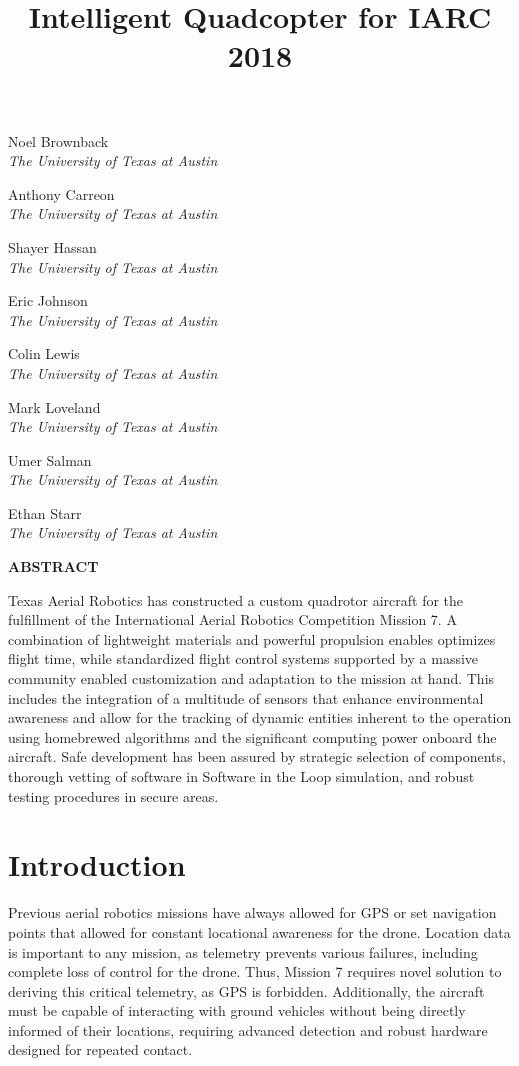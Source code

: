 \documentclass[12pt,letterpaper]{article}
\title{Intelligent Quadcopter for IARC 2018}
\newenvironment{nscenter}
 {\parskip=0pt\par\nopagebreak\centering}
 {\par\noindent\ignorespacesafterend}
\newcommand{\affiliatedauthor}[2]{
\begin{nscenter}
	#1 \\ \textit{#2}
\end{nscenter}
}
\renewcommand{\abstractname}{ABSTRACT}
\renewenvironment{abstract}
 {\vspace{-0.5ex}
	\small
	\begin{center}
		\bfseries \abstractname\vspace{-4ex}\vspace{0pt}
	\end{center}
	\list{}{
		\setlength{\leftmargin}{0.5in}
		\setlength{\rightmargin}{\leftmargin}
	}
	\item\relax}
 {\endlist}
\begin{document}
\begin{center}
	\textbf{\LARGE{\thetitle}}
\end{center}

\affiliatedauthor{Noel Brownback}{The University of Texas at Austin}
\affiliatedauthor{Anthony Carreon}{The University of Texas at Austin}
\affiliatedauthor{Shayer Hassan}{The University of Texas at Austin}
\affiliatedauthor{Eric Johnson}{The University of Texas at Austin}
\affiliatedauthor{Colin Lewis}{The University of Texas at Austin}
\affiliatedauthor{Mark Loveland}{The University of Texas at Austin}
\affiliatedauthor{Umer Salman}{The University of Texas at Austin}
\affiliatedauthor{Ethan Starr}{The University of Texas at Austin}


\begin{abstract}
	Texas Aerial Robotics has constructed a custom quadrotor aircraft for the fulfillment of the International Aerial Robotics Competition Mission 7. A combination of lightweight materials and powerful propulsion enables optimizes flight time, while standardized flight control systems supported by a massive community enabled customization and adaptation to the mission at hand. This includes the integration of a multitude of sensors that enhance environmental awareness and allow for the tracking of dynamic entities inherent to the operation using homebrewed algorithms and the significant computing power onboard the aircraft. Safe development has been assured by strategic selection of components, thorough vetting of software in Software in the Loop simulation, and robust testing procedures in secure areas.
\end{abstract}


\section*{Introduction}
	Previous aerial robotics missions have always allowed for GPS or set navigation points that allowed for constant locational awareness for the drone. Location data is important to any mission, as telemetry prevents various failures, including complete loss of control for the drone. Thus, Mission 7 requires novel solution to deriving this critical telemetry, as GPS is forbidden. Additionally, the aircraft must be capable of interacting with ground vehicles without being directly informed of their locations, requiring advanced detection and robust hardware designed for repeated contact.
\end{document}
